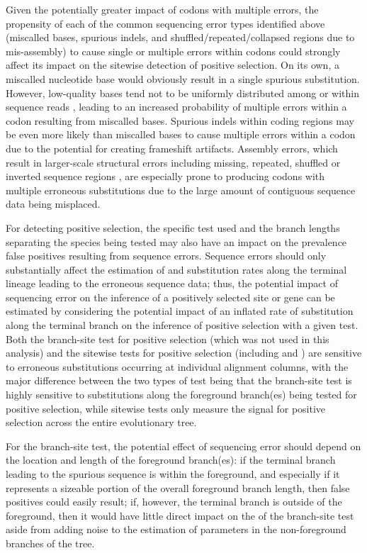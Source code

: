 Given the potentially greater impact of codons with multiple errors,
the propensity of each of the common sequencing error types identified
above (miscalled bases, spurious indels, and
shuffled/repeated/collapsed regions due to mis-assembly) to cause
single or multiple errors within codons could strongly affect its
impact on the sitewise detection of positive selection. On its own, a
miscalled nucleotide base would obviously result in a single spurious
substitution. However, low-quality bases tend not to be uniformly
distributed among or within sequence reads \citep{Kircher2009},
leading to an increased probability of multiple errors within a codon
resulting from miscalled bases. Spurious indels within coding regions
may be even more likely than miscalled bases to cause multiple errors
within a codon due to the potential for creating frameshift
artifacts. Assembly errors, which result in larger-scale structural
errors including missing, repeated, shuffled or inverted sequence
regions \citep{Jaffe2003}, are especially prone to producing codons
with multiple erroneous substitutions due to the large amount of
contiguous sequence data being misplaced.

For detecting positive selection, the specific test used and the
branch lengths separating the species being tested may also have an
impact on the prevalence false positives resulting from sequence
errors. Sequence errors should only substantially affect the
estimation of \nsyn and \syn substitution rates along the terminal
lineage leading to the erroneous sequence data; thus, the potential
impact of sequencing error on the inference of a positively selected
site or gene can be estimated by considering the potential impact of
an inflated rate of \nsyn substitution along the terminal branch on
the inference of positive selection with a given test. Both the
branch-site test for positive selection (which was not used in this
analysis) and the sitewise tests for positive selection (including
\pamlEight and \slr) are
sensitive to erroneous substitutions occurring at individual alignment
columns, with the major difference between the two types of test being
that the branch-site test is highly sensitive to substitutions along
the foreground branch(es) being tested for positive selection, while
sitewise tests only measure the signal for positive selection across
the entire evolutionary tree.

For the branch-site test, the potential effect of sequencing error
should depend on the location and length of the foreground branch(es):
if the terminal branch leading to the spurious sequence is within the
foreground, and especially if it represents a sizeable portion of the
overall foreground branch length, then false positives could easily
result; if, however, the terminal branch is outside of the foreground,
then it would have little direct impact on the \fpr of the branch-site
test aside from adding noise to the estimation of parameters in the
non-foreground branches of the tree.

